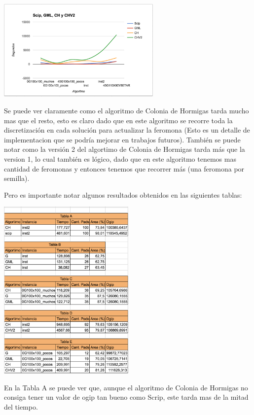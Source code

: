 \begin{center}
\includegraphics[width=0.6\textwidth]{imagenes/grafico10}
\end{center}


Se puede ver claramente como el algoritmo de Colonia de Hormigas tarda mucho mas que el resto, esto es claro dado que en este algoritmo se recorre toda la discretizaci\'on en cada soluci\'on para actualizar la feromona (Esto es un detalle de implementacion que se podr\'ia mejorar en trabajos futuros). 
Tambi\'en se puede notar como la versi\'on 2 del algortimo de Colonia de Hormigas tarda m\'as que la version 1, lo cual tambi\'en es l\'ogico, dado que en este algoritmo tenemos mas cantidad de feromonas y entonces tenemos que recorrer m\'as (una feromona por semilla).

Pero es importante notar algunos resultados obtenidos en las siguientes tablas:

\begin{center}
\includegraphics[width=0.5\textwidth]{imagenes/tabla11}
\end{center}

En la Tabla A se puede ver que, aunque el algoritmo de Colonia de Hormigas no consiga tener un valor de ogip tan bueno como Scrip, este tarda mas de la mitad del tiempo.

